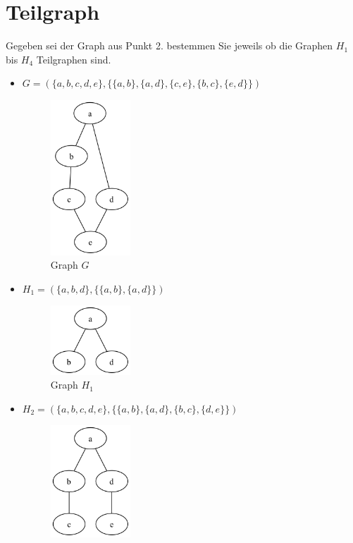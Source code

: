 \documentclass[a4paper,11pt]{report}
\begin{document}
\chapter{Teilgraph}

Gegeben sei der Graph aus Punkt 2. bestemmen Sie jeweils ob die Graphen $H_1$ bis $H_4$ Teilgraphen sind.
\begin{itemize}
    \item $G = (\{a, b, c, d, e\}, \{\{a, b\}, \{a, d\}, \{c, e\}, \{b, c\}, \{e, d\}\})$
    \begin{figure}[htbp]
        \centering
        \includegraphics[width=3cm]{notebook/assets/aufgabe_02_graph.png}
        \caption{Graph $G$}
        \label{fig:graph_h_1}
    \end{figure}
    \item $H_1 = (\{ a, b, d\}, \{ \{a, b\}, \{a, d\}\})$ 
    \begin{figure}[htbp]
        \centering
        \includegraphics[width=3cm]{notebook/assets/aufgabe_04_h1.png}
        \caption{Graph $H_1$}
        \label{fig:graph_h_1}
    \end{figure}
    \item $H_2 = (\{ a, b, c, d, e\}, \{ \{a, b\}, \{a, d\}, \{b, c\}, \{d, e\}\})$
    \begin{figure}[htbp]
        \centering
        \includegraphics[width=3cm]{notebook/assets/aufgabe_04_h2.png}

\end{figure}
\end{itemize}
\end{document}
